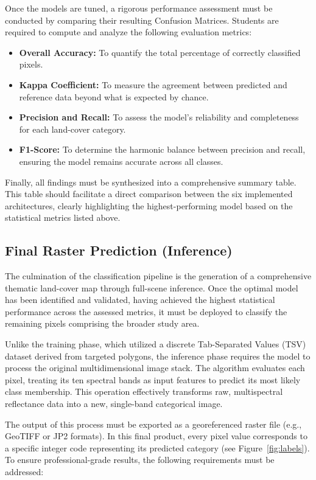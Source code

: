 \documentclass{article}
\begin{document}
Once the models are tuned, a rigorous performance assessment must be conducted by comparing their resulting Confusion Matrices. Students are required to compute and analyze the following evaluation metrics:
\begin{itemize}
    \item \textbf{Overall Accuracy:} To quantify the total percentage of correctly classified pixels.
    \item \textbf{Kappa Coefficient:} To measure the agreement between predicted and reference data beyond what is expected by chance.
    \item \textbf{Precision and Recall:} To assess the model's reliability and completeness for each land-cover category.
    \item \textbf{F1-Score:} To determine the harmonic balance between precision and recall, ensuring the model remains accurate across all classes.
\end{itemize}

Finally, all findings must be synthesized into a comprehensive summary table. This table should facilitate a direct comparison between the six implemented architectures, clearly highlighting the highest-performing model based on the statistical metrics listed above.

\subsection{Final Raster Prediction (Inference)}
The culmination of the classification pipeline is the generation of a comprehensive thematic land-cover map through full-scene inference. Once the optimal model has been identified and validated, having achieved the highest statistical performance across the assessed metrics, it must be deployed to classify the remaining pixels comprising the broader study area.

Unlike the training phase, which utilized a discrete Tab-Separated Values (TSV) dataset derived from targeted polygons, the inference phase requires the model to process the original multidimensional image stack. The algorithm evaluates each pixel, treating its ten spectral bands as input features to predict its most likely class membership. This operation effectively transforms raw, multispectral reflectance data into a new, single-band categorical image.

The output of this process must be exported as a georeferenced raster file (e.g., GeoTIFF or JP2 formats). In this final product, every pixel value corresponds to a specific integer code representing its predicted category (see Figure~\ref{fig:labels}). To ensure professional-grade results, the following requirements must be addressed:
\end{document}

